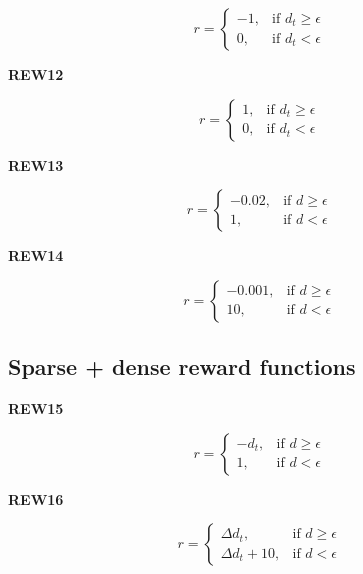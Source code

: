 \documentclass{article}
\begin{document}
\begin{equation}
r = \begin{cases}
    -1, & \text{if $d_t \geq \epsilon $}\\
    0, & \text{if $d_t < \epsilon $}
  \end{cases}
\end{equation}

\textbf{REW12}

\begin{equation}
r = \begin{cases}
    1, & \text{if $d_t \geq \epsilon $}\\
    0, & \text{if  $d_t < \epsilon $}
  \end{cases}
\end{equation}

\textbf{REW13}

\begin{equation}
r = \begin{cases}
    - 0.02 , & \text{if $d \geq \epsilon $}\\
    1 , & \text{if $d < \epsilon $}
  \end{cases}
\end{equation}

\textbf{REW14}

\begin{equation}
r = \begin{cases}
    - 0.001 , & \text{if $d \geq \epsilon $}\\
    10 , & \text{if $d < \epsilon $}
  \end{cases}
\end{equation}

\subsection{Sparse + dense reward functions}


\textbf{REW15}

\begin{equation}
r = \begin{cases}
    - d_t , & \text{if $d \geq \epsilon $}\\
    1 , & \text{if $d < \epsilon $}
  \end{cases}
\end{equation}


\textbf{REW16}

\begin{equation}
r = \begin{cases}
\Delta d_t, & \text{if $d \geq \epsilon $}\\
\Delta d_t + 10, & \text{if $d < \epsilon $}
  \end{cases}
\end{equation}
\end{document}
